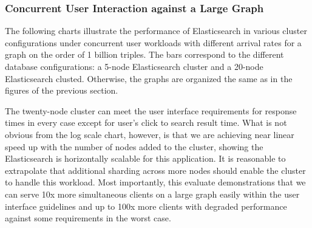 \subsubsection{Concurrent User Interaction against a Large Graph}
The following charts illustrate the performance of Elasticsearch in various cluster configurations under concurrent user workloads with different arrival rates for a graph on the order of 1 billion triples. 
The bars correspond to the different database configurations: a 5-node Elasticsearch cluster and a 20-node Elasticsearch clusted. 
Otherwise, the graphs are organized the same as in the figures of the previous section.

The twenty-node cluster can meet the user interface requirements for response times in every case except for user's click to search result time.  
What is not obvious from the log scale chart, however, is that we are achieving near linear speed up with the number of nodes added to the cluster, showing the Elasticsearch is horizontally scalable for this application.
It is reasonable to extrapolate that additional sharding across more nodes should enable the cluster to handle this workload.
Most importantly, this evaluate demonstrations that we can serve 10x more simultaneous clients on a large graph easily within the user interface guidelines and up to 100x more clients with degraded performance against some requirements in the worst case.  

